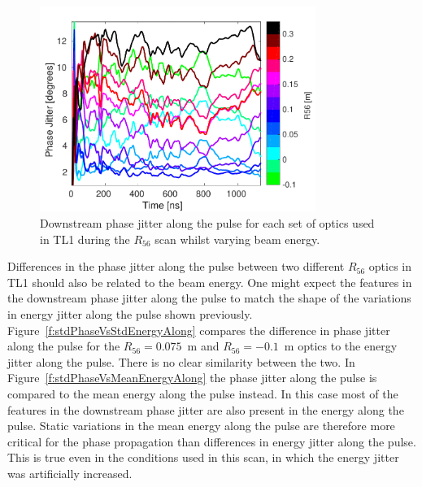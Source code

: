 \begin{figure}
  \centering
  \includegraphics[width=0.8\textwidth]{Figures/propagation/R56ScanGunWiggle_JitterAlong}
  \caption{Downstream phase jitter along the pulse for each set of optics used in TL1 during the \(R_{56}\) scan whilst varying beam energy.}
  \label{f:R56ScanGunWiggle_JitterAlong}
\end{figure}

Differences in the phase jitter along the pulse between two different \(R_{56}\) optics in TL1 should also be related to the beam energy. One might expect the features in the downstream phase jitter along the pulse to match the shape of the variations in energy jitter along the pulse shown previously. Figure~\ref{f:stdPhaseVsStdEnergyAlong} compares the difference in phase jitter along the pulse for the \(R_{56} = 0.075\)~m and \(R_{56} = -0.1\)~m optics to the energy jitter along the pulse. There is no clear similarity between the two. In Figure~\ref{f:stdPhaseVsMeanEnergyAlong} the phase jitter along the pulse is compared to the mean energy along the pulse instead. In this case most of the features in the downstream phase jitter are also present in the energy along the pulse. Static variations in the mean energy along the pulse are therefore more critical for the phase propagation than differences in energy jitter along the pulse. This is true even in the conditions used in this scan,  in which the energy jitter was artificially increased.

